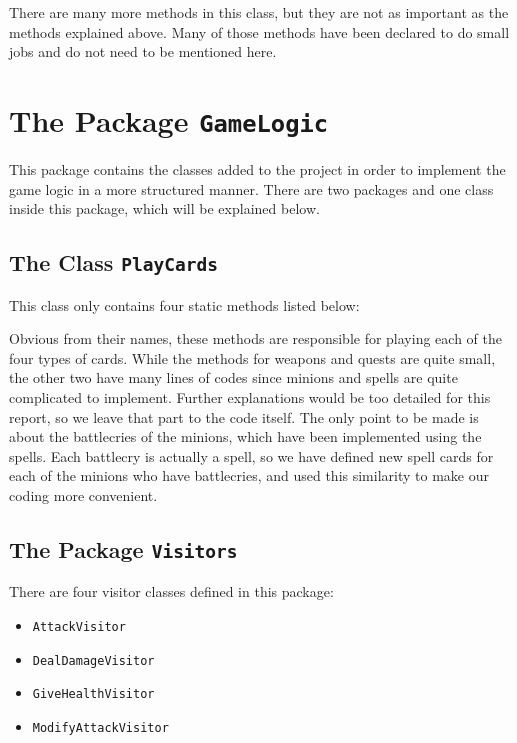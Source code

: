 \documentclass[a4paper]{article}
\begin{document}
There are many more methods in this class, but they are not as important as the methods explained above. Many of those methods have been declared to do small jobs and do not need to be mentioned here.

\clearpage
\section{The Package \texttt{GameLogic}}
This package contains the classes added to the project in order to implement the game logic in a more structured manner. There are two packages and one class inside this package, which will be explained below.

\subsection{The Class \texttt{PlayCards}}
This class only contains four static methods listed below:

	Obvious from their names, these methods are responsible for playing each of the four types of cards. While the methods for weapons and quests are quite small, the other two have many lines of codes since minions and spells are quite complicated to implement. Further explanations would be too detailed for this report, so we leave that part to the code itself. The only point to be made is about the battlecries of the minions, which have been implemented using the spells. Each battlecry is actually a spell, so we have defined new spell cards for each of the minions who have battlecries, and used this similarity to make our coding more convenient.
	
\subsection{The Package \texttt{Visitors}}
There are four visitor classes defined in this package:
\begin{itemize}
	\item \texttt{AttackVisitor}
	\item \texttt{DealDamageVisitor}
	\item \texttt{GiveHealthVisitor}
	\item \texttt{ModifyAttackVisitor}
\end{itemize}
\end{document}
